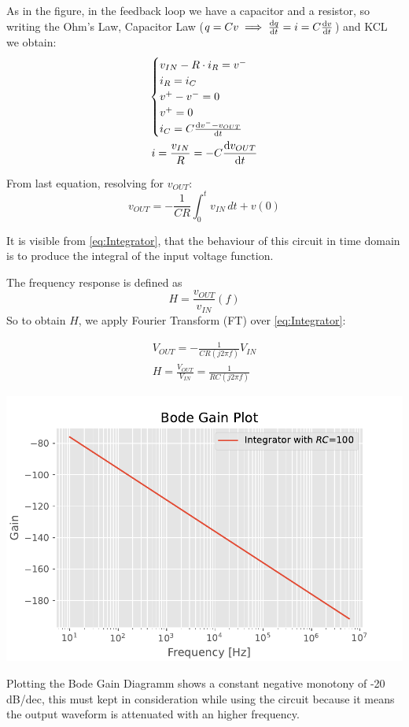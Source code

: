 \documentclass[a4paper,twocolumn]{article}
\begin{document}
As in the figure, in the feedback loop we have a capacitor and a resistor, so writing the Ohm's Law, Capacitor Law ($ q = Cv \implies \dv {q}{t}=i=C\dv{v}{t} $) and KCL we obtain:
\begin{gather*}
    \begin{cases}
        v_{IN} - R\cdot i_R = v^-\\
        i_R=i_C\\
        v^+-v^-=0\\
        v^+=0\\
        i_C=C\dv{v^--v_{OUT}}{t}
    \end{cases}\\
    i = \frac{v_{IN}}{R}=-C\dv{v_{OUT}}{t}\\
\end{gather*}

From last equation, resolving for $v_{OUT}$:
\begin{equation}
\label{eq:Integrator}
    v_{OUT}=-\frac{1}{CR}\int_0^t{v_{IN}}\,dt + v(0)
\end{equation}

It is visible from \eqref{eq:Integrator}, that the behaviour of this circuit in time domain is to produce the integral of the input voltage function.

The frequency response is defined as \[H=\frac{v_{OUT}}{v_{IN}}(f)\]
So to obtain $H$, we apply Fourier Transform (FT) over \eqref{eq:Integrator}:

\begin{gather}
    V_{OUT}=-\frac{1}{CR(j2\pi f)}V_{IN}\\
    H = \frac{V_{OUT}}{V_{IN}} = \frac{1}{RC(j2\pi f)}   
\end{gather}

\begin{center}
    \includegraphics[width=\columnwidth]{graph/IntegratorBodeTheo}
    \label{fig:IntBodeGraphTheo}
\end{center}
Plotting the Bode Gain Diagramm shows a constant negative monotony of -20 dB/dec, this must kept in consideration while using the circuit because it means the output waveform is attenuated with an higher frequency.
\end{document}

